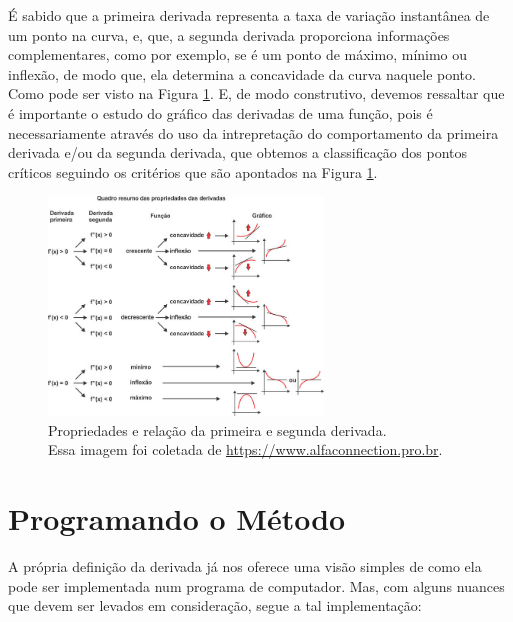 É sabido que a primeira derivada representa a taxa de variação instantânea de
um ponto na curva, e, que, a segunda derivada proporciona informações
complementares, como por exemplo, se é um ponto de máximo, mínimo ou inflexão,
de modo que, ela determina a concavidade da curva naquele ponto. Como pode ser
visto na Figura \ref{relacao_primeira_segunda_derivada}. E, de modo construtivo,
devemos ressaltar que é importante o estudo do gráfico das derivadas de uma
função, pois é necessariamente através do uso da intrepretação do comportamento
da primeira derivada e/ou da segunda derivada, que obtemos a classificação dos
pontos críticos seguindo os critérios que são apontados na Figura \ref{relacao_primeira_segunda_derivada}.

\begin{figure}[h]
    \includegraphics[width=0.65\textwidth]
      {src/relacao_primeira_segunda_derivada.jpg}
    \centering
    \caption{
      \centering
      Propriedades e relação da primeira e segunda derivada.\\
      {
        \tiny Essa imagem foi coletada de
          \url{https://www.alfaconnection.pro.br}.
      }
    }
    \label{relacao_primeira_segunda_derivada}
\end{figure}


\section{{Programando o Método}}

\hspace{0.8cm}


A própria definição da derivada já nos oferece uma visão simples de como
ela pode ser implementada num programa de computador. Mas, com alguns nuances
que devem ser levados em consideração, segue a tal implementação:




